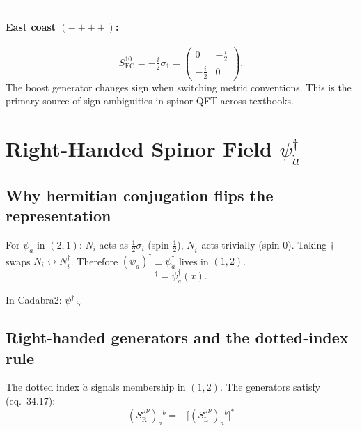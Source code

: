 \documentclass[12pt]{article}
\theoremstyle{remark}
\newcommand{\psidag}{\psi^{\dagger}}
\begin{document}
\medskip\noindent\rule{\linewidth}{0.4pt}\medskip

\paragraph{East coast $(-{+}{+}{+})$:}
\[
  S^{10}_{\mathrm{EC}} = -\tfrac{i}{2}\sigma_1
  = \begin{pmatrix}0 & -\tfrac{i}{2} \\ -\tfrac{i}{2} & 0\end{pmatrix}.
\]
The boost generator changes sign when switching metric conventions.
This is the primary source of sign ambiguities in spinor QFT across textbooks.

\section{Right-Handed Spinor Field
         \texorpdfstring{$\psidag_{\dot{a}}$}{psi-dagger}}

\subsection{Why hermitian conjugation flips the representation}

For $\psi_a$ in $(2,1)$:
$N_i$ acts as $\tfrac{1}{2}\sigma_i$ (spin-$\tfrac{1}{2}$),
$N^\dagger_i$ acts trivially (spin-$0$).
Taking $\dagger$ swaps $N_i \leftrightarrow N^\dagger_i$.
Therefore $(\psi_a)^\dagger \equiv \psidag_{\dot{a}}$ lives in $(1,2)$.
\begin{equation}
  [\psi_a(x)]^\dagger = \psidag_{\dot{a}}(x).
  \tag{34.11}
\end{equation}

\noindent In Cadabra2: $\psi^{\dagger}\,_{\dot{\alpha}}$

\subsection{Right-handed generators and the dotted-index rule}

The dotted index $\dot{a}$ signals membership in $(1,2)$.
The generators satisfy (eq.~34.17):
\begin{equation}
  \boxed{(S^{\mu\nu}_{\mathrm{R}})_{\dot{a}}{}^{\dot{b}}
  = -\bigl[(S^{\mu\nu}_{\mathrm{L}})_a{}^b\bigr]^*}
  \tag{34.17}
\end{equation}
\end{document}
